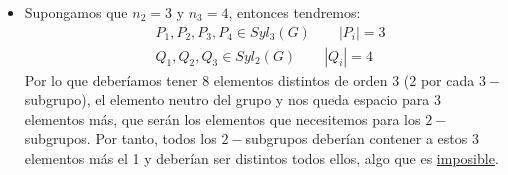 \begin{itemize}
    \item Supongamos que $n_2 = 3$ y $n_3 = 4$, entonces tendremos:
        \begin{align*}
            &P_1,P_2,P_3,P_4 \in Syl_3(G) \qquad |P_i| = 3 \\
            &Q_1,Q_2,Q_3 \in Syl_2(G) \qquad |Q_i| = 4
        \end{align*}
        Por lo que deberíamos tener $8$ elementos distintos de orden 3 (2 por cada $3-$subgrupo), el elemento neutro del grupo y nos queda espacio para 3 elementos más, que serán los elementos que necesitemos para los $2-$subgrupos. Por tanto, todos los $2-$subgrupos deberían contener a estos 3 elementos más el 1 y deberían ser distintos todos ellos, algo que es \underline{imposible}.


\end{itemize}
